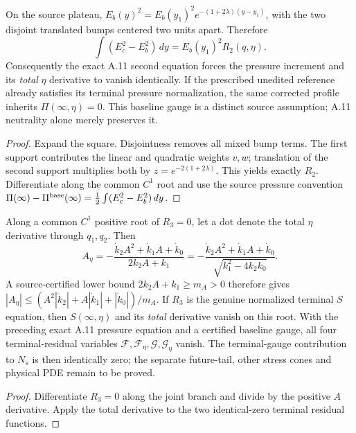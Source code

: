 \begin{proposition}
On the source plateau,
$E_b(y)^2=E_b(y_1)^2e^{-(1+2\lambda)(y-y_1)}$,
with the two disjoint translated bumps centered two units apart.
Therefore
\begin{equation}\label{eq:joint-A11-pressure-factor-20261022}
\boxed{\ \int(E_c^2-E_b^2)\,dy=E_b(y_1)^2R_2(q,\eta).\ }
\end{equation}
Consequently the exact A.11 second equation forces the pressure
increment and its \emph{total} $\eta$ derivative to vanish identically.
If the prescribed unedited reference already satisfies its
terminal pressure normalization, the same corrected profile
inherits $\Pi(\infty,\eta)=0$. This baseline gauge is a distinct
source assumption; A.11 neutrality alone merely preserves it.
\end{proposition}
\begin{proof}
Expand the square. Disjointness removes all mixed bump terms.
The first support contributes the linear and quadratic weights
$v,w$; translation of the second support multiplies both by
$z=e^{-2(1+2\lambda)}$. This yields exactly $R_2$.
Differentiate along the common $C^1$ root and use the source
pressure convention
$\Pi(\infty)-\Pi^{\rm base}(\infty)=\frac12\int(E_c^2-E_b^2)\,dy$.
\end{proof}

\begin{proposition}
Along a common $C^1$ positive root of $R_3=0$, let a dot
denote the total $\eta$ derivative through $q_1,q_2$.
Then
\[
\boxed{\quad
 A_\eta=-\frac{\dot k_2A^2+\dot k_1A+\dot k_0}
 {2k_2A+k_1}
 =-\frac{\dot k_2A^2+\dot k_1A+\dot k_0}
 {\sqrt{k_1^2-4k_2k_0}}.
\quad}
\]
A source-certified lower bound $2k_2A+k_1\ge m_A>0$
therefore gives
$|A_\eta|\le
(A^2|\dot k_2|+A|\dot k_1|+|\dot k_0|)/m_A$.
If $R_3$ is the genuine normalized terminal $S$ equation,
then $S(\infty,\eta)$ and its \emph{total} derivative vanish
on this root. With the preceding exact A.11 pressure equation
and a certified baseline gauge, all four terminal-residual variables
$\mathcal F,\mathcal F_\eta,\mathcal G,\mathcal G_\eta$ vanish.
The terminal-gauge contribution to $N_s$ is then identically zero;
the separate future-tail, other stress cones and physical PDE
remain to be proved.
\end{proposition}
\begin{proof}
Differentiate $R_3=0$ along the joint branch and divide
by the positive $A$ derivative. Apply the total derivative
to the two identical-zero terminal residual functions.
\end{proof}

